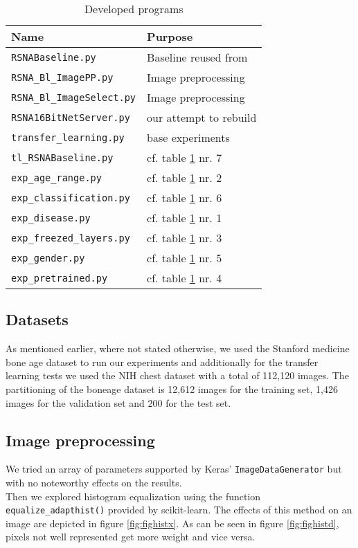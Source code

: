 \documentclass[10pt,twocolumn,letterpaper]{article}
\begin{document}
\begin{table}[h]
\begin{center}
\begin{tabular}{|l|l|}
\hline
Name & Purpose \\
\hline\hline
\verb+RSNABaseline.py+ & Baseline reused from \cite{kaggleboneage}  \\
\verb+RSNA_Bl_ImagePP.py+ & Image preprocessing \\
\verb+RSNA_Bl_ImageSelect.py+ & Image preprocessing \\
\verb+RSNA16BitNetServer.py+ & our attempt to rebuild \cite{16bitrsnachallenge} \\
\verb+transfer_learning.py+ & base experiments \\
\verb+tl_RSNABaseline.py+ & cf. table \ref{table:taexp} nr. 7  \\
\verb+exp_age_range.py+ & cf. table \ref{table:taexp} nr. 2 \\
\verb+exp_classification.py+ & cf. table \ref{table:taexp} nr. 6 \\
\verb+exp_disease.py+ & cf. table \ref{table:taexp} nr. 1 \\
\verb+exp_freezed_layers.py+ & cf. table \ref{table:taexp} nr. 3 \\
\verb+exp_gender.py+ & cf. table \ref{table:taexp} nr. 5 \\
\verb+exp_pretrained.py+ & cf. table \ref{table:taexp} nr. 4 \\
\hline
\end{tabular}
\end{center}
\caption{Developed programs}
\label{table:taexp}
\end{table}

\subsection{Datasets}
As mentioned earlier, where not stated otherwise, we used the Stanford medicine bone age dataset \cite{stanfordboneage} to run our experiments and additionally for the transfer learning tests we used the NIH chest dataset \cite{nihchestxray} with a total of 112,120 images. The partitioning of the boneage dataset is 12,612 images for the training set, 1,426 images for the validation set and 200 for the test set.

\subsection{Image preprocessing}
We tried an array of parameters supported by Keras' \verb+ImageDataGenerator+ but with no noteworthy effects on the results.\\
Then we explored histogram equalization using the function \verb+equalize_adapthist()+ provided by scikit-learn. The effects of this method on an image are depicted in figure \ref{fig:fighistx}. As can be seen in figure \ref{fig:fighistd}, pixels not well represented get more weight and vice versa.
\end{document}
